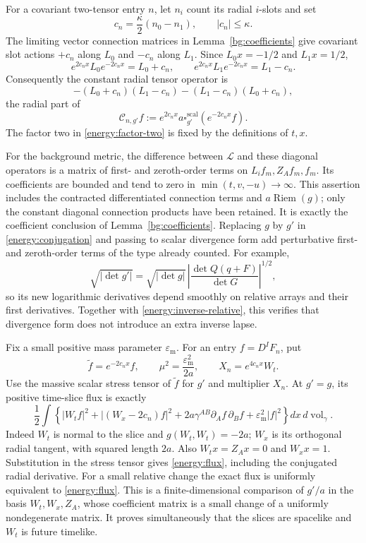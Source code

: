 For a covariant two-tensor entry \(n\), let \(n_i\) count its radial
\(i\)-slots and set
\[
 c_n=\frac\kappa2(n_0-n_1),\qquad |c_n|\le\kappa.
\]
The limiting vector connection matrices in Lemma~\ref{bg:coefficients}
give covariant slot actions \(+c_n\) along \(L_0\) and \(-c_n\)
along \(L_1\). Since \(L_0x=-1/2\) and \(L_1x=1/2\),
\begin{equation}\label{energy:factor-two}
 e^{2c_nx}L_0e^{-2c_nx}=L_0+c_n,
 \qquad e^{2c_nx}L_1e^{-2c_nx}=L_1-c_n.
\end{equation}
Consequently the constant radial tensor operator is
\[
 -(L_0+c_n)(L_1-c_n)-(L_1-c_n)(L_0+c_n),
\]
the radial part of
\begin{equation}\label{energy:conjugation}
 \mathcal C_{n,g'}f
       :=e^{2c_nx}a\square_{g'}^{\mathrm{scal}}(e^{-2c_nx}f).
\end{equation}
The factor two in \eqref{energy:factor-two} is fixed by the definitions
of \(t,x\).

For the background metric, the difference between \(\mathcal L\)
and these diagonal operators is a matrix of first- and zeroth-order
terms on \(L_if_m,Z_Af_m,f_m\). Its coefficients are bounded and
tend to zero in \(\min(t,v,-u)\to\infty\). This assertion includes
the contracted differentiated connection terms and
\(a\operatorname{Riem}(g)\); only the constant diagonal connection
products have been retained. It is exactly the coefficient conclusion
of Lemma~\ref{bg:coefficients}. Replacing \(g\) by \(g'\) in
\eqref{energy:conjugation} and passing to scalar divergence form add
perturbative first- and zeroth-order terms of the type already counted.
For example,
\[
 \sqrt{|\det g'|}=\sqrt{|\det g|}\,
           \left|\frac{\det Q(q+F)}{\det G}\right|^{1/2},
\]
so its new logarithmic derivatives depend smoothly on relative arrays
and their first derivatives. Together with
\eqref{energy:inverse-relative}, this verifies that divergence form
does not introduce an extra inverse lapse.

Fix a small positive mass parameter \(\varepsilon_{\mathrm m}\). For an entry
\(f=D^IF_n\), put
\[
 \widetilde f=e^{-2c_nx}f,\qquad
 \mu^2=\frac{\varepsilon_{\mathrm m}^2}{2a},\qquad
 X_n=e^{4c_nx}W_t.
\]
Use the massive scalar stress tensor of \(\widetilde f\) for \(g'\)
and multiplier \(X_n\). At \(g'=g\), its positive time-slice flux
is exactly
\begin{equation}\label{energy:flux}
 \frac12\int\left\{
 |W_tf|^2+|(W_x-2c_n)f|^2
     +2a\gamma^{AB}\partial_Af\,\partial_Bf
     +\varepsilon_{\mathrm m}^2|f|^2\right\}
                      dx\,d\operatorname{vol}_\gamma.
\end{equation}
Indeed \(W_t\) is normal to the slice and
\(g(W_t,W_t)=-2a\); \(W_x\) is its orthogonal radial tangent,
with squared length \(2a\). Also \(W_tx=Z_Ax=0\) and
\(W_xx=1\). Substitution in the stress tensor gives
\eqref{energy:flux}, including the conjugated radial derivative.
For a small relative change the exact flux is uniformly equivalent
to \eqref{energy:flux}. This is a finite-dimensional comparison of
\(g'/a\) in the basis \(W_t,W_x,Z_A\), whose coefficient matrix
is a small change of a uniformly nondegenerate matrix. It proves
simultaneously that the slices are spacelike and \(W_t\) is future
timelike.

